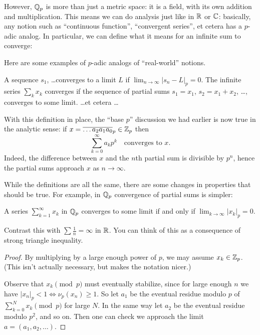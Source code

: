 However, $\mathbb Q_p$ is more than just a metric space:
it is a field, with its own addition and multiplication.
This means we can do analysis just like in $\mathbb R$ or $\mathbb C$:
basically, any notion such as ``continuous function'',
``convergent series'', et cetera has a $p$-adic analog.
In particular, we can define what it means for an infinite sum to converge:
\begin{definition}
	Here are some examples of $p$-adic analogs of ``real-world'' notions.
	\begin{itemize}
		\ii A sequence $s_1$, \dots converges to a limit $L$
		if $\lim_{n \to \infty} \left\lvert s_n - L \right\rvert_p = 0$.
		\ii The infinite series $\sum_k x_k$ converges
		if the sequence of partial sums $s_1 = x_1$,
		$s_2 = x_1 + x_2$, \dots, converges to some limit.
		\ii \dots et cetera \dots
	\end{itemize}
\end{definition}
With this definition in place,
the ``base $p$'' discussion we had earlier is now true
in the analytic sense: if $x = \overline{\dots a_2 a_1 a_0}_p \in \mathbb Z_p$ then
\[ \sum_{k=0}^\infty a_k p^k \quad\text{converges to } x. \]
Indeed, the difference between $x$ and the $n$th partial sum is divisible by $p^n$,
hence the partial sums approach $x$ as $n \to \infty$.

While the definitions are all the same,
there are some changes in properties that should be true.
For example, in $\mathbb Q_p$ convergence of partial sums is simpler:
\begin{proposition}
	A series $\sum_{k=1}^\infty x_k$ in $\mathbb Q_p$
	converges to some limit if and only if
	$\lim_{k \to \infty} |x_k|_p = 0$.
	\label{noharmonic}
\end{proposition}
Contrast this with $\sum \frac1n = \infty$ in $\mathbb R$.
You can think of this as a consequence of strong triangle inequality.
\begin{proof}
	By multiplying by a large enough power of $p$,
	we may assume $x_k \in \mathbb Z_p$.
	(This isn't actually necessary, but makes the notation nicer.)

	Observe that $x_k \pmod p$ must eventually stabilize,
	since for large enough $n$ we have
	$\left\lvert x_n \right\rvert_p < 1 \iff \nu_p(x_n) \ge 1$.
	So let $a_1$ be the eventual residue modulo $p$
	of $\sum_{k=0}^N x_k \pmod p$ for large $N$.
	In the same way let $a_2$ be the eventual residue modulo $p^2$, and so on.
	Then one can check we approach the limit $a = (a_1, a_2, \dots)$.
\end{proof}

